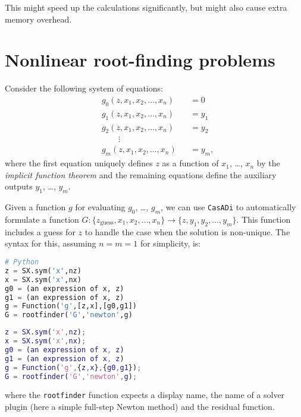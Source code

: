 \documentclass[a4paper,12pt]{book}
\newcommand{\CasADi}{\texttt{CasADi}\xspace}
\begin{document}
This might speed up the calculations significantly, but might also cause extra memory overhead.

\section{Nonlinear root-finding problems} \label{sec:rootfinder}
Consider the following system of equations:
\begin{equation}\label{eq:rfp}
\begin{aligned}
&g_0(z, x_1, x_2, \ldots, x_n) &&= 0 \\
&g_1(z, x_1, x_2, \ldots, x_n) &&= y_1 \\
&g_2(z, x_1, x_2, \ldots, x_n) &&= y_2 \\
&\qquad \vdots \qquad &&\qquad \\
&g_m(z, x_1, x_2, \ldots, x_n) &&= y_m,
\end{aligned}
\end{equation}
where the first equation uniquely defines $z$ as a function of $x_1$, \ldots, $x_n$ by the \emph{implicit function theorem}
and the remaining equations define the auxiliary outputs $y_1$, \ldots, $y_m$.

Given a function $g$ for evaluating $g_0$, \ldots, $g_m$, we can use \CasADi to automatically formulate a function
$G: \{z_{\text{guess}}, x_1, x_2, \ldots, x_n\} \rightarrow \{z, y_1, y_2, \ldots, y_m\}$.
This function includes a guess for $z$ to handle the case when the solution is non-unique.
The syntax for this, assuming $n=m=1$ for simplicity, is:


\begin{minipage}[t]{0.5\textwidth}
\begin{lstlisting}[language=Python]
# Python
z = SX.sym('x',nz)
x = SX.sym('x',nx)
g0 = (an expression of x, z)
g1 = (an expression of x, z)
g = Function('g',[z,x],[g0,g1])
G = rootfinder('G','newton',g)
\end{lstlisting}
\end{minipage}
\begin{minipage}[t]{0.5\textwidth}
\begin{lstlisting}[language=Matlab]
% MATLAB
z = SX.sym('x',nz);
x = SX.sym('x',nx);
g0 = (an expression of x, z)
g1 = (an expression of x, z)
g = Function('g',{z,x},{g0,g1});
G = rootfinder('G','newton',g);
\end{lstlisting}
\end{minipage}

where the \texttt{rootfinder} function expects a display name, the name of a solver plugin
(here a simple full-step Newton method) and the residual function.
\end{document}
